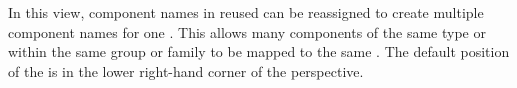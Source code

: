 \item[\gdcompnamesview]{In this view, component names in reused \gdcases can 
be reassigned to create multiple component names for one \gdstep{}. This
allows many components of the same  type or within the same group 
or family  to be mapped to the same 
\gdstep{}. The default position of the \gdcompnamesview is in the 
lower right-hand corner of the perspective.
}
